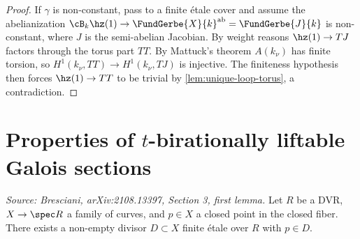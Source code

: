 \begin{proof}
  If \(\gamma\) is non-constant, pass to a finite étale cover and assume the
  abelianization \(\cB_k \hz(1) \to \FundGerbe{X}{k}^{\mathrm{ab}} = \FundGerbe{J}{k}\)
  is non-constant, where \(J\) is the semi-abelian Jacobian. By weight reasons
  \(\hz(1) \to TJ\) factors through the torus part \(TT\). By Mattuck's theorem
  \(A(k_\nu)\) has finite torsion, so \(H^1(k_\nu, TT) \to H^1(k_\nu, TJ)\) is
  injective. The finiteness hypothesis then forces \(\hz(1) \to TT\) to be trivial
  by \cref{lem:unique-loop-torus}, a contradiction.
\end{proof}

\section{Properties of \(t\)-birationally liftable Galois sections}


\begin{lemma}[FinEtaleDivisor]
  \label{lem:fin-etale-divisor}
  \textit{Source: Bresciani, arXiv:2108.13397, Section 3, first lemma.}
  Let \(R\) be a DVR, \(X \to \spec R\) a family of curves, and \(p \in X\) a closed
  point in the closed fiber. There exists a non-empty divisor \(D \subset X\) finite
  étale over \(R\) with \(p \in D\).
\end{lemma}

